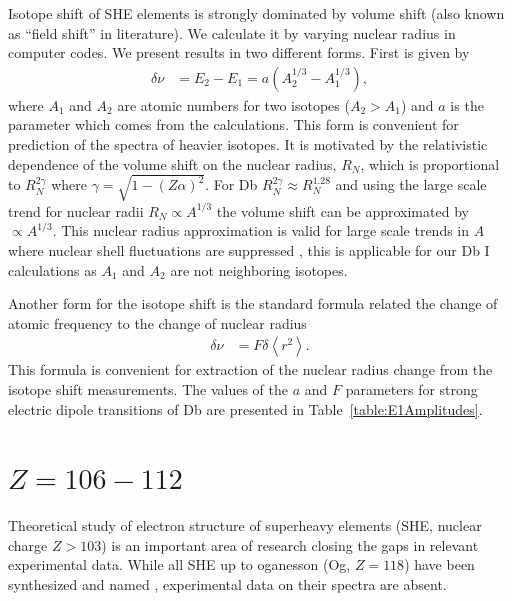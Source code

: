 \documentclass[8pt,a4paper, twoside]{report}
\begin{document}
Isotope shift of SHE elements is strongly dominated by volume shift (also known as ``field shift'' in literature). We calculate it by varying nuclear radius in 
computer codes. We present results in two different forms. First is given by~\cite{DFW17}
\begin{align*}
\delta \nu &= E_{2} - E_{1} = a\left(A_{2}^{1/3} - A_{1}^{1/3}\right),
\end{align*}
where $A_1$ and $A_2$ are atomic numbers for two isotopes ($A_2>A_1$) and $a$ is the parameter which
comes from the calculations. This form is convenient for prediction of the spectra of heavier isotopes. It is motivated by the relativistic dependence of the volume shift on the nuclear radius, $R_N$, which is proportional to $R_N^{2\gamma}$ where $\gamma = \sqrt{1 - (Z\alpha)^2}$. For  Db  $R_N^{ 2\gamma}  \approx R_{N}^{1.28}$ and using the large scale trend for nuclear radii $R_N \propto A^{1/3}$  the volume shift can be approximated by $\propto A^{1/3}$. This nuclear radius approximation is valid for large scale trends in $A$ where nuclear shell fluctuations are suppressed \cite{Angeli2013, DFW17}, this is applicable for our Db I calculations as $A_1$ and $A_2$ are not neighboring isotopes.

Another form for the isotope shift is the standard formula related the change of atomic frequency to the change
of nuclear radius
\begin{align*}
\delta \nu &= F\delta \left<r^{2}\right>.
\end{align*}
This formula is convenient for extraction of the nuclear radius change from the isotope shift measurements.
The values of the $a$ and $F$ parameters for strong electric dipole transitions of Db are presented in 
Table~\ref{table:E1Amplitudes}.


\chapter{$Z=106-112$}
Theoretical study of electron structure of superheavy elements (SHE, nuclear charge $Z>103$) is an important area of research closing the gaps in relevant experimental data. While all SHE up to oganesson (Og, $Z=118$) have been synthesized and named \cite{Karol2016, HHO2013, OUL2004}, experimental data on their spectra are absent.
\end{document}
